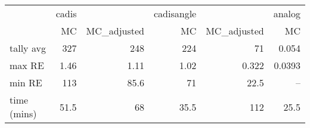 \begin{tabular}{lrrrrr}
\toprule
{} & cadis &             & cadisangle &             & analog \\
{} &    MC & MC\_adjusted &         MC & MC\_adjusted &     MC \\
\midrule
tally avg   &   327 &         248 &        224 &          71 &  0.054 \\
max RE      &  1.46 &        1.11 &       1.02 &       0.322 & 0.0393 \\
min RE      &   113 &        85.6 &         71 &        22.5 &    -- \\
time (mins) &  51.5 &          68 &       35.5 &         112 &   25.5 \\
\bottomrule
\end{tabular}
